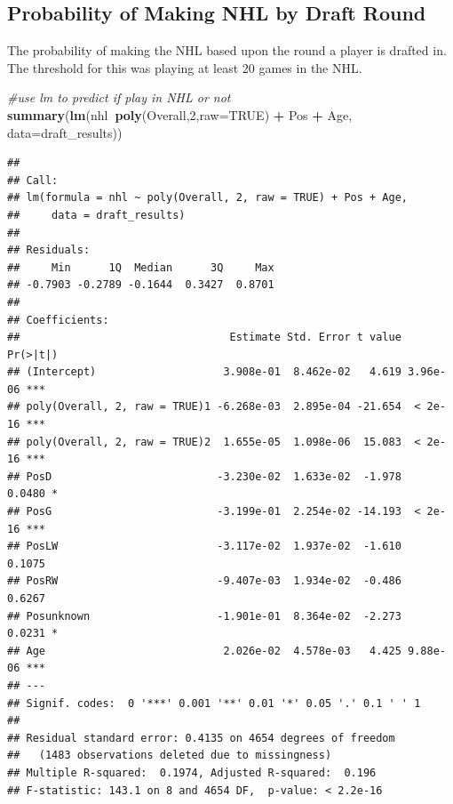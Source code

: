 \documentclass[]{article}
\newenvironment{Shaded}{\begin{snugshade}}{\end{snugshade}}
\newcommand{\CommentTok}[1]{\textcolor[rgb]{0.56,0.35,0.01}{\textit{#1}}}
\newcommand{\DataTypeTok}[1]{\textcolor[rgb]{0.13,0.29,0.53}{#1}}
\newcommand{\DecValTok}[1]{\textcolor[rgb]{0.00,0.00,0.81}{#1}}
\newcommand{\KeywordTok}[1]{\textcolor[rgb]{0.13,0.29,0.53}{\textbf{#1}}}
\newcommand{\NormalTok}[1]{#1}
\newcommand{\OperatorTok}[1]{\textcolor[rgb]{0.81,0.36,0.00}{\textbf{#1}}}
\newcommand{\OtherTok}[1]{\textcolor[rgb]{0.56,0.35,0.01}{#1}}
\newcommand{\StringTok}[1]{\textcolor[rgb]{0.31,0.60,0.02}{#1}}
\begin{document}
\hypertarget{probability-of-making-nhl-by-draft-round}{%
\subsection{Probability of Making NHL by Draft
Round}\label{probability-of-making-nhl-by-draft-round}}

The probability of making the NHL based upon the round a player is
drafted in. The threshold for this was playing at least 20 games in the
NHL.

\begin{Shaded}
\begin{Highlighting}[]
\CommentTok{#use lm to predict if play in NHL or not}
\KeywordTok{summary}\NormalTok{(}\KeywordTok{lm}\NormalTok{(nhl}\OperatorTok{~}\KeywordTok{poly}\NormalTok{(Overall,}\DecValTok{2}\NormalTok{,}\DataTypeTok{raw=}\OtherTok{TRUE}\NormalTok{) }\OperatorTok{+}\StringTok{ }\NormalTok{Pos }\OperatorTok{+}\StringTok{ }\NormalTok{Age, }\DataTypeTok{data=}\NormalTok{draft_results))}
\end{Highlighting}
\end{Shaded}

\begin{verbatim}
## 
## Call:
## lm(formula = nhl ~ poly(Overall, 2, raw = TRUE) + Pos + Age, 
##     data = draft_results)
## 
## Residuals:
##     Min      1Q  Median      3Q     Max 
## -0.7903 -0.2789 -0.1644  0.3427  0.8701 
## 
## Coefficients:
##                                 Estimate Std. Error t value Pr(>|t|)    
## (Intercept)                    3.908e-01  8.462e-02   4.619 3.96e-06 ***
## poly(Overall, 2, raw = TRUE)1 -6.268e-03  2.895e-04 -21.654  < 2e-16 ***
## poly(Overall, 2, raw = TRUE)2  1.655e-05  1.098e-06  15.083  < 2e-16 ***
## PosD                          -3.230e-02  1.633e-02  -1.978   0.0480 *  
## PosG                          -3.199e-01  2.254e-02 -14.193  < 2e-16 ***
## PosLW                         -3.117e-02  1.937e-02  -1.610   0.1075    
## PosRW                         -9.407e-03  1.934e-02  -0.486   0.6267    
## Posunknown                    -1.901e-01  8.364e-02  -2.273   0.0231 *  
## Age                            2.026e-02  4.578e-03   4.425 9.88e-06 ***
## ---
## Signif. codes:  0 '***' 0.001 '**' 0.01 '*' 0.05 '.' 0.1 ' ' 1
## 
## Residual standard error: 0.4135 on 4654 degrees of freedom
##   (1483 observations deleted due to missingness)
## Multiple R-squared:  0.1974, Adjusted R-squared:  0.196 
## F-statistic: 143.1 on 8 and 4654 DF,  p-value: < 2.2e-16
\end{verbatim}
\end{document}
